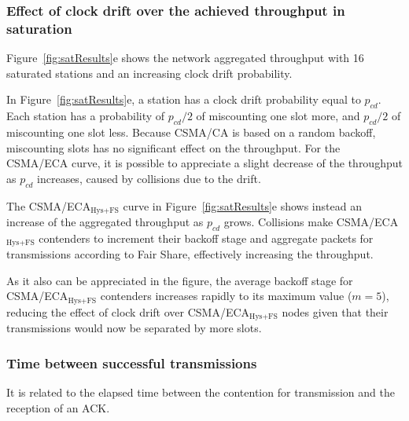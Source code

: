 	\subsubsection{Effect of clock drift over the achieved throughput in saturation}\label{performanceClockDrift}
	Figure~\ref{fig:satResults}e shows the network aggregated throughput with 16 saturated stations and an increasing clock drift probability.
	
	
	In Figure~\ref{fig:satResults}e, a station has a clock drift probability equal to $p_{cd}$. Each station has a probability of $p_{cd}/2$ of miscounting one slot more, and $p_{cd}/2$ of miscounting one slot less. Because CSMA/CA is based on a random backoff, miscounting slots has no significant effect on the throughput. For the CSMA/ECA curve, it is possible to appreciate a slight decrease of the throughput as $p_{cd}$ increases, caused by collisions due to the drift.
	
	The CSMA/ECA$_{\text{Hys+FS}}$ curve in Figure~\ref{fig:satResults}e shows instead an increase of the aggregated throughput as $p_{cd}$ grows. Collisions make CSMA/ECA$_{\text{Hys+FS}}$ contenders to increment their backoff stage and aggregate packets for transmissions according to Fair Share, effectively increasing the throughput. 
	
	As it also can be appreciated in the figure, the average backoff stage for CSMA/ECA$_{\text{Hys+FS}}$ contenders increases rapidly to its maximum value ($m=5$), reducing the effect of clock drift over CSMA/ECA$_{\text{Hys+FS}}$ nodes given that their transmissions would now be separated by more slots.\\
	
	\subsubsection{Time between successful transmissions}\label{timeBetweenSxTx}
	It is related to the elapsed time between the contention for transmission and the reception of an ACK.

	
